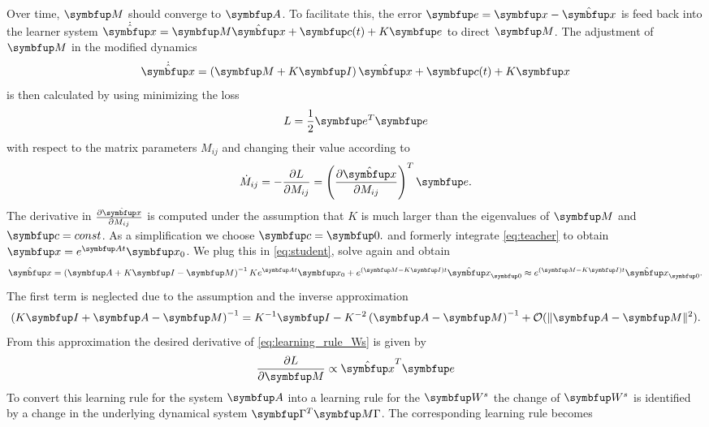 Over time, $\bmu{M}$ should converge to $\bmu{A}$. To facilitate this, the error $\bmu{e} = \bmu{x} - \hat{\bmu{x}}$ is feed back into the learner system $\dot{\hat{\bmu{x}}} =\bmu{M}\hat{\bmu{x}} + \bmu{c}(t)  + K\bmu{e}$ to direct $\bmu{M}$.
The adjustment of $\bmu{M}$ in the modified dynamics
\begin{equation}\label{eq:student}
	\dot{\hat{\bmu{x}}} = \left(\bmu{M} + K\bmu{I}\right)\hat{\bmu{x}} + \bmu{c}(t) + K\bmu{x}
\end{equation}
is then calculated by using minimizing the loss
\begin{equation}
	L = \frac{1}{2}\bmu{e}^T\bmu{e}
\end{equation}
with respect to the matrix parameters $M_{ij}$ and changing their value according to
\begin{equation}\label{eq:learning_rule_Ws}
	\dot{M}_{ij} = -\frac{\partial L}{\partial M_{ij}} = \left(\frac{\partial \hat{\bmu{x}}}{\partial M_{ij}}\right)^T\bmu{e}.
\end{equation}
The derivative in $\frac{\partial \hat{\bmu{x}}}{\partial M_{ij}}$ is computed under the assumption that $K$ is much larger than the eigenvalues of $\bmu{M}$ and $\bmu{c} = const$. As a simplification we choose $\bmu{c} = \bmu{0}.$ and formerly integrate \cref{eq:teacher} to obtain $\bmu{x} = e^{\bmu{A}t}\bmu{x_0}$. We plug this in \cref{eq:student}, solve again and obtain
\begin{equation}\label{eq:hat_x_derivative}
	\hat{\bmu{x}} = \left(\bmu{A} + K\bmu{I} - \bmu{M}\right)^{-1}K e^{\bmu{A}t}\bmu{x_0} + e^{\left(\bmu{M}- K\bmu{I}\right)t}\hat{\bmu{x}}_{\bmu{0}}  \approx e^{\left(\bmu{M}- K\bmu{I}\right)t}\hat{\bmu{x}}_{\bmu{0}}.
\end{equation}
The first term is neglected due to the assumption and the inverse approximation
\begin{equation}
	\left(K\bmu{I} + \bmu{A} - \bmu{M}\right)^{-1}  = K^{-1}\bmu{I} - K^{-2}\left(\bmu{A} - \bmu{M}\right)^{-1} + \mathcal{O}(\|\bmu{A - \bmu{M}}\|^2).
\end{equation}
From this approximation the desired derivative of \cref{eq:learning_rule_Ws} is given by
\begin{equation}
	\frac{\partial L}{\partial \bmu{M}}\propto \hat{\bmu{x}}^T\bmu{e}
\end{equation}
To convert this learning rule for the system $\bmu{A}$ into a learning rule for the $\bmu{W}^s$ the change of $\bmu{W}^s$ is identified by a change in the underlying dynamical system $\bmu{\Gamma}^T \bmu{M \Gamma}$. The corresponding learning rule becomes
